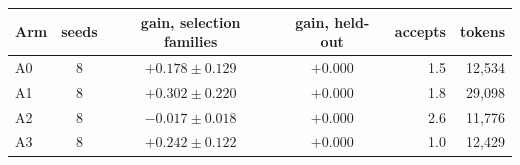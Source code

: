 \begin{tabular}{lcccrr}\toprule
Arm & seeds & gain, selection families & gain, held-out & accepts & tokens \\\midrule
A0 & 8 & $+0.178\pm0.129$ & $+0.000$ & 1.5 & 12,534 \\
A1 & 8 & $+0.302\pm0.220$ & $+0.000$ & 1.8 & 29,098 \\
A2 & 8 & $-0.017\pm0.018$ & $+0.000$ & 2.6 & 11,776 \\
A3 & 8 & $+0.242\pm0.122$ & $+0.000$ & 1.0 & 12,429 \\
\bottomrule\end{tabular}